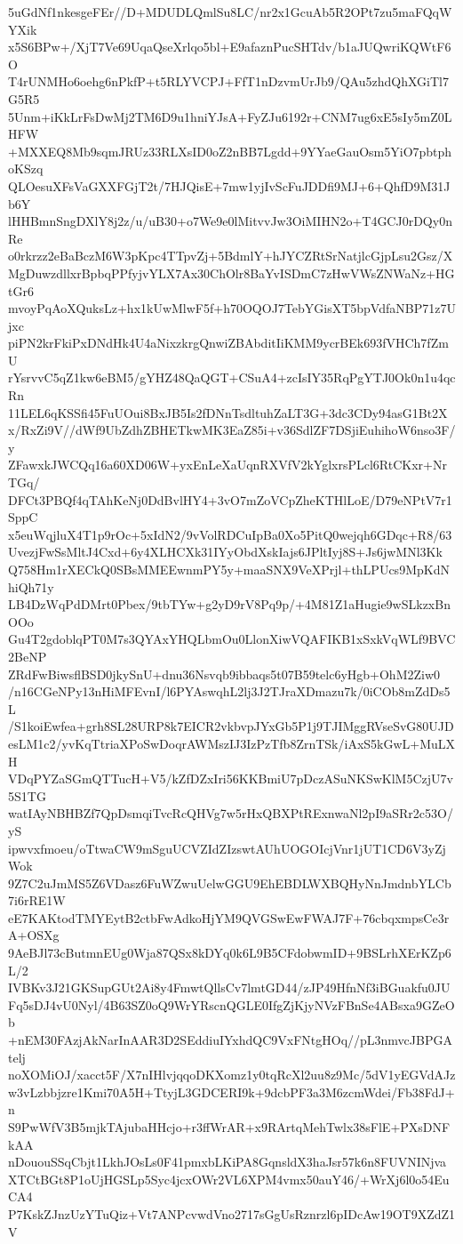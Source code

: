 5uGdNf1nkesgeFEr//D+MDUDLQmlSu8LC/nr2x1GcuAb5R2OPt7zu5maFQqWYXik
x5S6BPw+/XjT7Ve69UqaQseXrlqo5bl+E9afaznPucSHTdv/b1aJUQwriKQWtF6O
T4rUNMHo6oehg6nPkfP+t5RLYVCPJ+FfT1nDzvmUrJb9/QAu5zhdQhXGiTl7G5R5
5Unm+iKkLrFsDwMj2TM6D9u1hniYJsA+FyZJu6192r+CNM7ug6xE5sIy5mZ0LHFW
+MXXEQ8Mb9sqmJRUz33RLXsID0oZ2nBB7Lgdd+9YYaeGauOsm5YiO7pbtphoKSzq
QLOesuXFsVaGXXFGjT2t/7HJQisE+7mw1yjIvScFuJDDfi9MJ+6+QhfD9M31Jb6Y
lHHBmnSngDXlY8j2z/u/uB30+o7We9e0lMitvvJw3OiMIHN2o+T4GCJ0rDQy0nRe
o0rkrzz2eBaBczM6W3pKpc4TTpvZj+5BdmlY+hJYCZRtSrNatjlcGjpLsu2Gsz/X
MgDuwzdllxrBpbqPPfyjvYLX7Ax30ChOlr8BaYvISDmC7zHwVWsZNWaNz+HGtGr6
mvoyPqAoXQuksLz+hx1kUwMlwF5f+h70OQOJ7TebYGisXT5bpVdfaNBP71z7Ujxc
piPN2krFkiPxDNdHk4U4aNixzkrgQnwiZBAbditIiKMM9ycrBEk693fVHCh7fZmU
rYsrvvC5qZ1kw6eBM5/gYHZ48QaQGT+CSuA4+zcIsIY35RqPgYTJ0Ok0n1u4qcRn
11LEL6qKSSfi45FuUOui8BxJB5Is2fDNnTsdltuhZaLT3G+3dc3CDy94asG1Bt2X
x/RxZi9V//dWf9UbZdhZBHETkwMK3EaZ85i+v36SdlZF7DSjiEuhihoW6nso3F/y
ZFawxkJWCQq16a60XD06W+yxEnLeXaUqnRXVfV2kYglxrsPLcl6RtCKxr+NrTGq/
DFCt3PBQf4qTAhKeNj0DdBvlHY4+3vO7mZoVCpZheKTHlLoE/D79eNPtV7r1SppC
x5euWqjluX4T1p9rOc+5xIdN2/9vVolRDCuIpBa0Xo5PitQ0wejqh6GDqc+R8/63
UvezjFwSsMltJ4Cxd+6y4XLHCXk31IYyObdXskIajs6JPltIyj8S+Js6jwMNl3Kk
Q758Hm1rXECkQ0SBsMMEEwnmPY5y+maaSNX9VeXPrjl+thLPUcs9MpKdNhiQh71y
LB4DzWqPdDMrt0Pbex/9tbTYw+g2yD9rV8Pq9p/+4M81Z1aHugie9wSLkzxBnOOo
Gu4T2gdoblqPT0M7s3QYAxYHQLbmOu0LlonXiwVQAFIKB1xSxkVqWLf9BVC2BeNP
ZRdFwBiwsflBSD0jkySnU+dnu36Nsvqb9ibbaqs5t07B59telc6yHgb+OhM2Ziw0
/n16CGeNPy13nHiMFEvnI/l6PYAswqhL2lj3J2TJraXDmazu7k/0iCOb8mZdDs5L
/S1koiEwfea+grh8SL28URP8k7EICR2vkbvpJYxGb5P1j9TJIMggRVseSvG80UJD
esLM1c2/yvKqTtriaXPoSwDoqrAWMszIJ3IzPzTfb8ZrnTSk/iAxS5kGwL+MuLXH
VDqPYZaSGmQTTucH+V5/kZfDZxIri56KKBmiU7pDczASuNKSwKlM5CzjU7v5S1TG
watIAyNBHBZf7QpDsmqiTvcRcQHVg7w5rHxQBXPtRExnwaNl2pI9aSRr2c53O/yS
ipwvxfmoeu/oTtwaCW9mSguUCVZIdZIzswtAUhUOGOIcjVnr1jUT1CD6V3yZjWok
9Z7C2uJmMS5Z6VDasz6FuWZwuUelwGGU9EhEBDLWXBQHyNnJmdnbYLCb7i6rRE1W
eE7KAKtodTMYEytB2ctbFwAdkoHjYM9QVGSwEwFWAJ7F+76cbqxmpsCe3rA+OSXg
9AeBJl73cButmnEUg0Wja87QSx8kDYq0k6L9B5CFdobwmID+9BSLrhXErKZp6L/2
IVBKv3J21GKSupGUt2Ai8y4FmwtQllsCv7lmtGD44/zJP49HfnNf3iBGuakfu0JU
Fq5sDJ4vU0Nyl/4B63SZ0oQ9WrYRscnQGLE0IfgZjKjyNVzFBnSe4ABsxa9GZeOb
+nEM30FAzjAkNarInAAR3D2SEddiuIYxhdQC9VxFNtgHOq//pL3nmvcJBPGAtelj
noXOMiOJ/xacct5F/X7nIHlvjqqoDKXomz1y0tqRcXl2uu8z9Mc/5dV1yEGVdAJz
w3vLzbbjzre1Kmi70A5H+TtyjL3GDCERI9k+9dcbPF3a3M6zcmWdei/Fb38FdJ+n
S9PwWfV3B5mjkTAjubaHHcjo+r3ffWrAR+x9RArtqMehTwlx38sFlE+PXsDNFkAA
nDououSSqCbjt1LkhJOsLs0F41pmxbLKiPA8GqnsldX3haJsr57k6n8FUVNINjva
XTCtBGt8P1oUjHGSLp5Syc4jcxOWr2VL6XPM4vmx50auY46/+WrXj6l0o54EuCA4
P7KskZJnzUzYTuQiz+Vt7ANPcvwdVno2717sGgUsRznrzl6pIDcAw19OT9XZdZ1V
